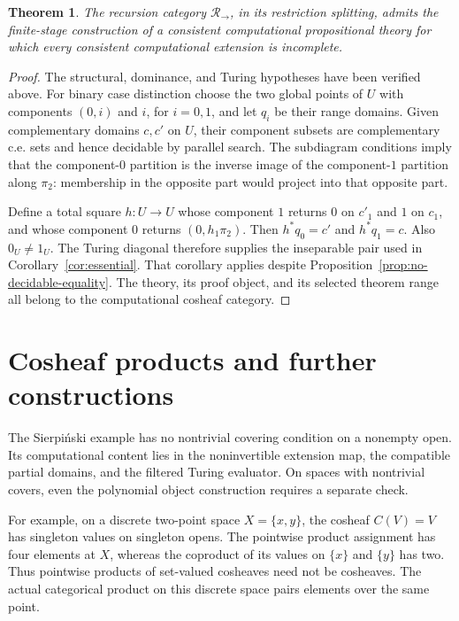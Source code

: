 \documentclass[11pt]{article}
\newtheorem{theorem}{Theorem}[section]
\theoremstyle{definition}\newtheorem{definition}[theorem]{Definition}
\theoremstyle{remark}\newtheorem{remark}[theorem]{Remark}
\begin{document}
\begin{theorem}\label{thm:cosheaf-essential}
The recursion category \(\mathscr R_\to\), in its restriction
splitting, admits the finite-stage construction of a consistent
computational propositional theory for which every consistent
computational extension is incomplete.
\end{theorem}
\begin{proof}
The structural, dominance, and Turing hypotheses have been
verified above. For binary case distinction choose the two global
points of \(U\) with components \((0,i)\) and \(i\), for
\(i=0,1\), and let \(q_i\) be their range domains.
Given complementary domains \(c,c'\) on \(U\), their component
subsets are complementary c.e. sets and hence decidable by parallel
search. The subdiagram conditions imply that the component-\(0\)
partition is the inverse image of the component-\(1\) partition
along \(\pi_2\): membership in the opposite part would project
into that opposite part.

Define a total square \(h:U\to U\) whose component \(1\) returns
\(0\) on \(c'_1\) and \(1\) on \(c_1\), and whose component \(0\)
returns \((0,h_1\pi_2)\). Then \(h^*q_0=c'\) and \(h^*q_1=c\).
Also \(0_U\ne1_U\). The Turing diagonal therefore supplies the
inseparable pair used in Corollary~\ref{cor:essential}.
That corollary applies despite Proposition~\ref{prop:no-decidable-equality}.
The theory, its proof object, and its selected theorem range all
belong to the computational cosheaf category.
\end{proof}

\section{Cosheaf products and further constructions}\label{sec:limits}

The Sierpi\'nski example has no nontrivial covering condition on a
nonempty open. Its computational content lies in the noninvertible
extension map, the compatible partial domains, and the filtered
Turing evaluator. On spaces with nontrivial covers, even the
polynomial object construction requires a separate check.

For example, on a discrete two-point space \(X=\{x,y\}\), the
cosheaf \(C(V)=V\) has singleton values on singleton opens.
The pointwise product assignment has four elements at \(X\),
whereas the coproduct of its values on \(\{x\}\) and \(\{y\}\)
has two. Thus pointwise products of set-valued cosheaves need
not be cosheaves. The actual categorical product on this discrete
space pairs elements over the same point.
\end{document}
